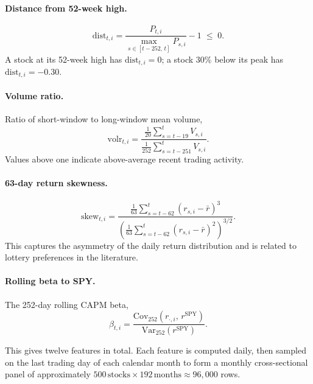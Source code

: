 \documentclass[11pt]{article}
\begin{document}
\paragraph{Distance from 52-week high.}
\begin{equation}
\text{dist}_{t,i} = \frac{P_{t,i}}{\max_{s \in [t-252,\, t]} P_{s,i}} - 1 \;\le\; 0.
\end{equation}
A stock at its 52-week high has $\text{dist}_{t,i}=0$; a stock 30\% below its peak has
$\text{dist}_{t,i}=-0.30$.

\paragraph{Volume ratio.} Ratio of short-window to long-window mean volume,
\begin{equation}
\text{volr}_{t,i} = \frac{\frac{1}{20}\sum_{s=t-19}^{t} V_{s,i}}
                         {\frac{1}{252}\sum_{s=t-251}^{t} V_{s,i}}.
\end{equation}
Values above one indicate above-average recent trading activity.

\paragraph{63-day return skewness.}
\begin{equation}
\text{skew}_{t,i} = \frac{\frac{1}{63} \sum_{s=t-62}^{t} (r_{s,i} - \bar{r})^3}
                         {\left(\frac{1}{63} \sum_{s=t-62}^{t} (r_{s,i} - \bar{r})^2\right)^{3/2}}.
\end{equation}
This captures the asymmetry of the daily return distribution and is related to lottery
preferences in the literature.

\paragraph{Rolling beta to SPY.} The 252-day rolling CAPM beta,
\begin{equation}
\beta_{t,i} = \frac{\mathrm{Cov}_{252}(r_{\cdot,i},\, r^{\text{SPY}})}
                   {\mathrm{Var}_{252}(r^{\text{SPY}})}.
\end{equation}

\bigskip
This gives twelve features in total. Each feature is computed daily, then sampled on the
last trading day of each calendar month to form a monthly cross-sectional panel of
approximately $500\,\text{stocks} \times 192\,\text{months} \approx 96{,}000$ rows.

\end{document}
